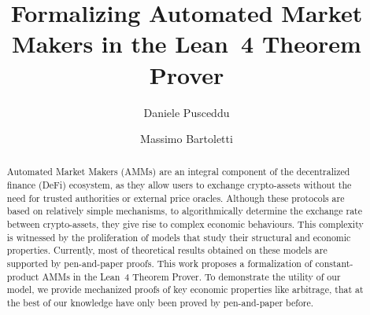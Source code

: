 \documentclass[a4paper,UKenglish,cleveref,autoref,thm-restate]{oasics-v2021}
\title{Formalizing Automated Market Makers in the Lean~4 Theorem Prover}
\author{Daniele Pusceddu}{ETH Zurich, Switzerland \and University of Cagliari, Italy }{dpusceddu@student.ethz.ch}{}{}%
\author{Massimo Bartoletti}{University of Cagliari, Italy \and \url{http://blockchain.unica.it} }{bart@unica.it}{https://orcid.org/0000-0003-3796-9774}{Partially supported by project SERICS (PE00000014) and PRIN 2022 DeLiCE (F53D23009130001) under the MUR National Recovery and Resilience Plan funded by the European Union -- NextGenerationEU.}
\begin{document}
\maketitle

\begin{abstract}
Automated Market Makers (AMMs) are an integral component of the decentralized finance (DeFi) ecosystem, as they allow users to exchange crypto-assets 
without the need for trusted authorities or external price oracles. 
Although these protocols are based on relatively simple mechanisms, 
\eg to algorithmically determine the exchange rate between crypto-assets, 
they give rise to complex economic behaviours. 
This complexity is witnessed by the proliferation of models that study their structural and economic properties. 
Currently, most of theoretical results obtained on these models 
are supported by pen-and-paper proofs.
This work proposes a formalization of constant-product AMMs in the Lean~4 Theorem Prover.
To demonstrate the utility of our model, 
we provide mechanized proofs of key economic properties
like arbitrage, that at the best of our knowledge have only been proved 
by pen-and-paper before.
\end{abstract}










\end{document}
